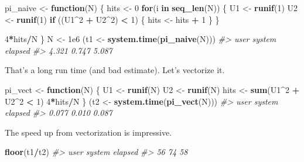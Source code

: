 \documentclass[]{book}
\newenvironment{Shaded}{\begin{snugshade}}{\end{snugshade}}
\newcommand{\CommentTok}[1]{\textcolor[rgb]{0.56,0.35,0.01}{\textit{#1}}}
\newcommand{\ControlFlowTok}[1]{\textcolor[rgb]{0.13,0.29,0.53}{\textbf{#1}}}
\newcommand{\DecValTok}[1]{\textcolor[rgb]{0.00,0.00,0.81}{#1}}
\newcommand{\FloatTok}[1]{\textcolor[rgb]{0.00,0.00,0.81}{#1}}
\newcommand{\KeywordTok}[1]{\textcolor[rgb]{0.13,0.29,0.53}{\textbf{#1}}}
\newcommand{\NormalTok}[1]{#1}
\newcommand{\OperatorTok}[1]{\textcolor[rgb]{0.81,0.36,0.00}{\textbf{#1}}}
\newcommand{\StringTok}[1]{\textcolor[rgb]{0.31,0.60,0.02}{#1}}
\theoremstyle{definition}
\theoremstyle{definition}
\theoremstyle{definition}
\theoremstyle{remark}
\begin{document}
\begin{Shaded}
\begin{Highlighting}[]
\NormalTok{pi_naive <-}\StringTok{ }\ControlFlowTok{function}\NormalTok{(N) \{}
\NormalTok{  hits <-}\StringTok{ }\DecValTok{0}
  \ControlFlowTok{for}\NormalTok{(i }\ControlFlowTok{in} \KeywordTok{seq_len}\NormalTok{(N)) \{}
\NormalTok{    U1 <-}\StringTok{ }\KeywordTok{runif}\NormalTok{(}\DecValTok{1}\NormalTok{)}
\NormalTok{    U2 <-}\StringTok{ }\KeywordTok{runif}\NormalTok{(}\DecValTok{1}\NormalTok{)}
    \ControlFlowTok{if}\NormalTok{ ((U1}\OperatorTok{^}\DecValTok{2} \OperatorTok{+}\StringTok{ }\NormalTok{U2}\OperatorTok{^}\DecValTok{2}\NormalTok{) }\OperatorTok{<}\StringTok{ }\DecValTok{1}\NormalTok{) \{}
\NormalTok{      hits <-}\StringTok{ }\NormalTok{hits }\OperatorTok{+}\StringTok{ }\DecValTok{1}
\NormalTok{    \}}
\NormalTok{  \}}
  
  \DecValTok{4}\OperatorTok{*}\NormalTok{hits}\OperatorTok{/}\NormalTok{N}
\NormalTok{\}}
\NormalTok{N <-}\StringTok{ }\FloatTok{1e6}
\NormalTok{(t1 <-}\StringTok{ }\KeywordTok{system.time}\NormalTok{(}\KeywordTok{pi_naive}\NormalTok{(N)))}
\CommentTok{#>    user  system elapsed }
\CommentTok{#>   4.321   0.747   5.087}
\end{Highlighting}
\end{Shaded}

That's a long run time (and bad estimate). Let's vectorize it.

\begin{Shaded}
\begin{Highlighting}[]
\NormalTok{pi_vect <-}\StringTok{ }\ControlFlowTok{function}\NormalTok{(N) \{}
\NormalTok{  U1 <-}\StringTok{ }\KeywordTok{runif}\NormalTok{(N)}
\NormalTok{  U2 <-}\StringTok{ }\KeywordTok{runif}\NormalTok{(N)}
\NormalTok{  hits <-}\StringTok{ }\KeywordTok{sum}\NormalTok{(U1}\OperatorTok{^}\DecValTok{2} \OperatorTok{+}\StringTok{ }\NormalTok{U2}\OperatorTok{^}\DecValTok{2} \OperatorTok{<}\StringTok{ }\DecValTok{1}\NormalTok{)}
  \DecValTok{4}\OperatorTok{*}\NormalTok{hits}\OperatorTok{/}\NormalTok{N}
\NormalTok{\}}
\NormalTok{(t2 <-}\StringTok{ }\KeywordTok{system.time}\NormalTok{(}\KeywordTok{pi_vect}\NormalTok{(N)))}
\CommentTok{#>    user  system elapsed }
\CommentTok{#>   0.077   0.010   0.087}
\end{Highlighting}
\end{Shaded}

The speed up from vectorization is impressive.

\begin{Shaded}
\begin{Highlighting}[]
\KeywordTok{floor}\NormalTok{(t1}\OperatorTok{/}\NormalTok{t2)}
\CommentTok{#>    user  system elapsed }
\CommentTok{#>      56      74      58}
\end{Highlighting}
\end{Shaded}
\end{document}
